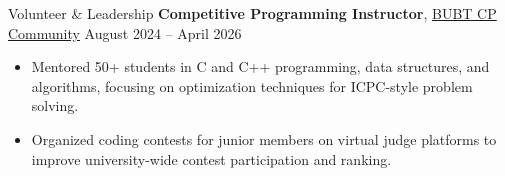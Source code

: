 \documentclass{resume}
\begin{document}
\begin{minipage}[t]{0.46\textwidth}
\begin{rSection}{Volunteer \& Leadership}
\textbf{Competitive Programming Instructor}, \newline
\href{https://www.facebook.com/CPBUBT}{BUBT CP Community}
\hfill August 2024 -- April 2026
\vspace{4pt}
\begin{itemize}
    \item Mentored 50+ students in C and C++ programming, data structures, and algorithms, focusing on optimization techniques for ICPC-style problem solving.
    \item Organized coding contests for junior members on virtual judge platforms to improve university-wide contest participation and ranking.
\end{itemize}


\end{rSection}


\end{minipage}
\end{document}
